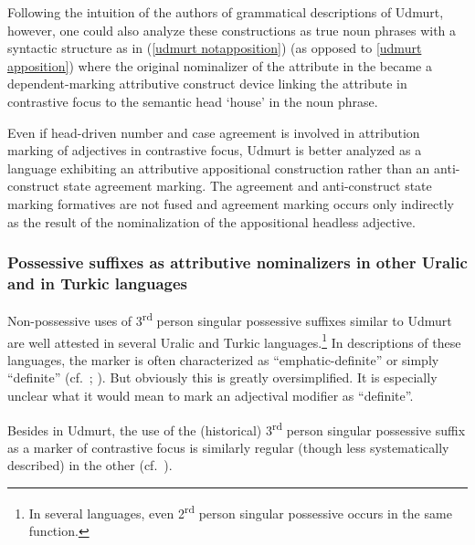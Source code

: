 \newpage %
Following the intuition of the authors of grammatical descriptions of Udmurt, however, one could also analyze these constructions as true noun phrases with a syntactic structure as in (\ref{udmurt notapposition}) (as opposed to \ref{udmurt apposition}) where the original nominalizer of the attribute in the  became a dependent\hyp{}marking attributive construct device linking the attribute in contrastive focus to the semantic head ‘house’ in the noun phrase.
\begin{exe}
\label{udmurt notapposition}
\end{exe}

Even if head\hyp{}driven number and case agreement is involved in attribution marking of adjectives in contrastive focus, Udmurt is better analyzed as a language exhibiting an attributive appositional construction rather than an anti\hyp{}construct state agreement marking. The agreement and anti\hyp{}construct state marking formatives are not fused and agreement marking occurs only indirectly as the result of the nominalization of the appositional headless adjective.

\subsubsection[Possessive suffixes as attributive nominalizers]{Possessive suffixes as attributive nominalizers in other Uralic and in Turkic languages}
Non-possessive uses of 3\textsuperscript{rd} person singular possessive suffixes similar to Udmurt are well attested in several Uralic and Turkic languages.\footnote{In several languages, even 2\textsuperscript{rd} person singular possessive occurs in the same function.} In descriptions of these languages, the marker is often characterized as “emphatic-definite” or simply “definite” (cf.~\citealt[148]{tauli1966}; \citealt{kunnap2004}). But obviously this is greatly oversimplified. It is especially unclear what it would mean to mark an adjectival modifier as “definite”.

Besides in Udmurt, the use of the (historical) 3\textsuperscript{rd} person singular possessive suffix as a marker of contrastive focus is similarly regular (though less systematically described) in the other  (cf.~\citealt[67]{serebrennikov1963}).%

